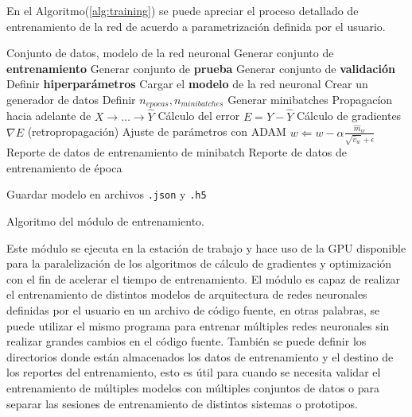     En el Algoritmo(\ref{alg:training}) se puede apreciar el proceso detallado de entrenamiento de la red de acuerdo a parametrización definida 
    por el usuario. 
    
    \begin{algorithm}
        \begin{algorithmic}[1]
        \REQUIRE Conjunto de datos, modelo de la red neuronal
        \STATE Generar conjunto de \textbf{entrenamiento}
        \STATE Generar conjunto de \textbf{prueba}
        \STATE Generar conjunto de \textbf{validación}
        \STATE Definir \textbf{hiperparámetros}
        \STATE Cargar el \textbf{modelo} de la red neuronal
        \STATE Crear un generador de datos
        \STATE Definir $n_{epocas}, n_{minibatches}$
            \STATE Generar minibatches
                \STATE Propagacíon hacia adelante de $X\rightarrow\dots \rightarrow\hat{Y}$ 
                \STATE Cálculo del error $E = Y - \hat{Y}$
                \STATE Cálculo de gradientes $\nabla E$ (retropropagación)
                \STATE Ajuste de parámetros con ADAM $w \Leftarrow w - \alpha \frac{\hat{m}_w}{\sqrt{\hat{v}_w} + \epsilon}$
                \STATE Reporte de datos de entrenamiento de minibatch
            \ENDFOR
            \STATE Reporte de datos de entrenamiento de época
        \ENDFOR

        \STATE Guardar modelo en archivos \lstinline{.json} y \lstinline{.h5}
        
        \end{algorithmic}
        \caption{Algoritmo del módulo de entrenamiento.}\label{alg:training}
    \end{algorithm}

    Este módulo se ejecuta en la estación de trabajo y hace uso de la GPU disponible para la paralelización de los algoritmos de 
    cálculo de gradientes y optimización con el fin de acelerar el tiempo de entrenamiento. El módulo es capaz de realizar 
    el entrenamiento de distintos modelos de arquitectura de redes neuronales definidas por el usuario en un archivo de código 
    fuente, en otras palabras, se puede utilizar el mismo programa para entrenar múltiples redes neuronales sin realizar grandes 
    cambios en el código fuente. También se puede definir los directorios donde están almacenados los datos de entrenamiento y 
    el destino de los reportes del entrenamiento, esto es útil para cuando se necesita validar el entrenamiento de múltiples 
    modelos con múltiples conjuntos de datos o para separar las sesiones de entrenamiento de distintos sistemas o prototipos.

